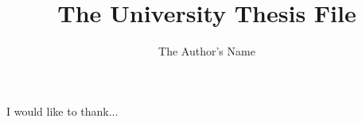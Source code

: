 \documentclass[12pt,MSc,twoside]{muthesis}
\numberwithin{equation}{chapter}															%
\begin{document}
\title{The University Thesis File}
\author{The Author's Name}

\def\wordcount{nnnnn}


\beforeabstract
\afterabstract


I would like to thank...
\afterpreface																																				%

\raggedright          																															%


 

\printbibliography

\end{document}
